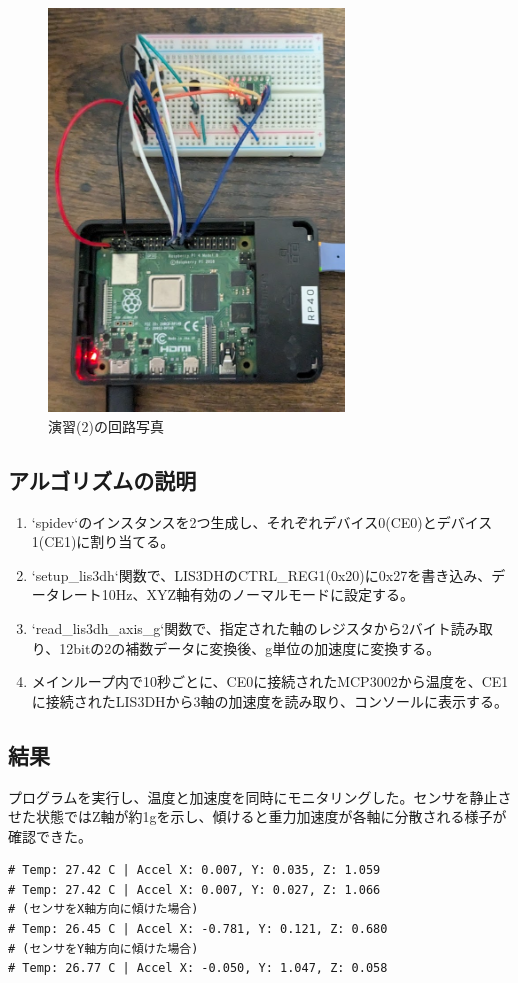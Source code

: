 \documentclass[a4paper,11pt,dvipdfmx]{jsarticle}
\begin{document}
\begin{figure}[H]
    \centering
    \includegraphics[width=0.7\textwidth]{img/9-2.png}
    \caption{演習(2)の回路写真}
    \label{fig:photo2}
\end{figure}

\subsection{アルゴリズムの説明}
\begin{enumerate}
    \item `spidev`のインスタンスを2つ生成し、それぞれデバイス0(CE0)とデバイス1(CE1)に割り当てる。
    \item `setup\_lis3dh`関数で、LIS3DHのCTRL\_REG1(0x20)に0x27を書き込み、データレート10Hz、XYZ軸有効のノーマルモードに設定する。
    \item `read\_lis3dh\_axis\_g`関数で、指定された軸のレジスタから2バイト読み取り、12bitの2の補数データに変換後、g単位の加速度に変換する。
    \item メインループ内で10秒ごとに、CE0に接続されたMCP3002から温度を、CE1に接続されたLIS3DHから3軸の加速度を読み取り、コンソールに表示する。
\end{enumerate}

\subsection{結果}
プログラムを実行し、温度と加速度を同時にモニタリングした。センサを静止させた状態ではZ軸が約1gを示し、傾けると重力加速度が各軸に分散される様子が確認できた。
\begin{verbatim}
# Temp: 27.42 C | Accel X: 0.007, Y: 0.035, Z: 1.059
# Temp: 27.42 C | Accel X: 0.007, Y: 0.027, Z: 1.066
# (センサをX軸方向に傾けた場合)
# Temp: 26.45 C | Accel X: -0.781, Y: 0.121, Z: 0.680
# (センサをY軸方向に傾けた場合)
# Temp: 26.77 C | Accel X: -0.050, Y: 1.047, Z: 0.058
\end{verbatim}
\end{document}

